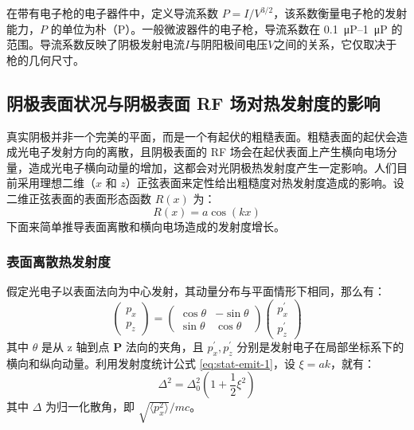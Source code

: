 	在带有电子枪的电子器件中，定义导流系数 $P=I/V^{3/2}$，该系数衡量电子枪的发射能力，$P$ 的单位为朴（P）。一般微波器件的电子枪，导流系数在 \SIrange[range-phrase = --]{0.1}{1}{\micro P} 的范围。导流系数反映了阴极发射电流$I$与阴阳极间电压$V$之间的关系，它仅取决于枪的几何尺寸。

\subsection{阴极表面状况与阴极表面 RF 场对热发射度的影响}
真实阴极并非一个完美的平面，而是一个有起伏的粗糙表面。粗糙表面的起伏会造成光电子发射方向的离散，且阴极表面的 RF 场会在起伏表面上产生横向电场分量，造成光电子横向动量的增加，这都会对光阴极热发射度产生一定影响。人们目前采用理想二维（$x$ 和 $z$）正弦表面来定性给出粗糙度对热发射度造成的影响\cite{He:2004aa,Krasilnikov:2006aa}。设二维正弦表面的表面形态函数 $R(x)$ 为：
\[
	R(x) = a\cos(kx)
\]
下面来简单推导表面离散和横向电场造成的发射度增长。
\subsubsection{表面离散热发射度}
假定光电子以表面法向为中心发射，其动量分布与平面情形下相同，那么有：
\[
\left(\begin{array}{c}
p_x\\
p_z
\end{array}\right)=
\left(\begin{array}{cc}
\cos\theta & -\sin\theta\\
\sin\theta & \cos\theta 
\end{array}\right)
\left(\begin{array}{c}
p_x^{\prime}\\
p_z^{\prime}
\end{array}\right)
\]
其中 $\theta$ 是从 z 轴到点 \textbf{P} 法向的夹角，且 $p_x^{\prime}, p_z^{\prime}$ 分别是发射电子在局部坐标系下的横向和纵向动量。利用发射度统计公式 \ref{eq:stat-emit-1}，设 $\xi=ak$，就有：
\begin{equation}
\Delta^2 = \Delta_{0}^2\left(1+\frac{1}{2}\xi^2\right)
\end{equation}
其中 $\Delta$ 为归一化散角，即 $\sqrt{\langle p_x^2\rangle}/mc$。

